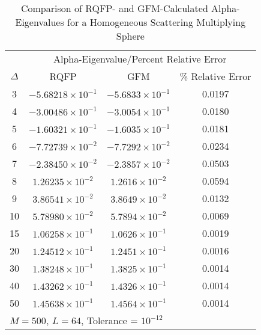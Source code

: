 \begin{table*}[!htbp]
\centering{}
\caption{Comparison of RQFP- and GFM-Calculated Alpha-Eigenvalues for a Homogeneous Scattering Multiplying Sphere}
\label{table:CompHomogMultSphere}
\begin{tabular}{@{}cccc@{}}\toprule
& \multicolumn{3}{c}{Alpha-Eigenvalue/Percent Relative Error} \\
\cmidrule{2-4} $\Delta$ & RQFP & GFM & \% Relative Error \\
\midrule
3 & $-5.68218 \times 10^{-1}$ & $-5.6833 \times 10^{-1}$ & 0.0197 \\ 
4 & $-3.00486 \times 10^{-1}$ & $-3.0054 \times 10^{-1}$ & 0.0180 \\ 
5 & $ -1.60321 \times 10^{-1}$ & $-1.6035 \times 10^{-1}$ & 0.0181 \\ 
6 & $ -7.72739 \times 10^{-2}$ & $-7.7292 \times 10^{-2}$ & 0.0234 \\ 
7 & $-2.38450 \times 10^{-2}$ & $-2.3857 \times 10^{-2}$ & 0.0503 \\ 
8 & $1.26235 \times 10^{-2}$ & $1.2616 \times 10^{-2}$ & 0.0594 \\ 
9 & $ 3.86541 \times 10^{-2}$ & $3.8649 \times 10^{-2}$ & 0.0132 \\ 
10 & $5.78980 \times 10^{-2}$ & $5.7894 \times 10^{-2}$ & 0.0069 \\ 
15 & $1.06258 \times 10^{-1}$ & $1.0626 \times 10^{-1}$ & 0.0019 \\ 
20 & $1.24512 \times 10^{-1}$ & $1.2451 \times 10^{-1}$ &  0.0016 \\ 
30 & $1.38248 \times 10^{-1}$ & $1.3825 \times 10^{-1}$ &  0.0014 \\ 
40 & $1.43262 \times 10^{-1}$ & $1.4326 \times 10^{-1}$ &  0.0014 \\ 
50 & $1.45638 \times 10^{-1}$ & $1.4564 \times 10^{-1}$ &  0.0014 \\ 
\bottomrule
\multicolumn{4}{l}{$M = 500$, $L = 64$, Tolerance = $10^{-12}$} \\
\end{tabular}
\end{table*}

